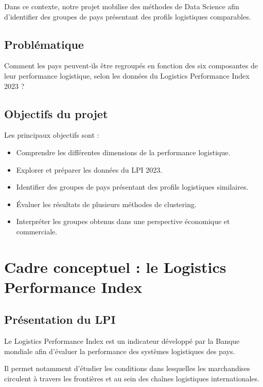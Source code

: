 \documentclass[11pt,a4paper]{article}
\begin{document}
Dans ce contexte, notre projet mobilise des méthodes de Data
Science afin d'identifier des groupes de pays présentant des
profils logistiques comparables.

\subsection*{Problématique}

Comment les pays peuvent-ils être regroupés en fonction des six
composantes de leur performance logistique, selon les données
du Logistics Performance Index 2023 ?

\subsection*{Objectifs du projet}

Les principaux objectifs sont :

\begin{itemize}
    \item Comprendre les différentes dimensions de la performance
    logistique.
    \item Explorer et préparer les données du LPI 2023.
    \item Identifier des groupes de pays présentant des profils
    logistiques similaires.
    \item Évaluer les résultats de plusieurs méthodes de clustering.
    \item Interpréter les groupes obtenus dans une perspective
    économique et commerciale.
\end{itemize}


\section{Cadre conceptuel : le Logistics Performance Index}

\subsection{Présentation du LPI}

Le Logistics Performance Index est un indicateur développé
par la Banque mondiale afin d'évaluer la performance des systèmes
logistiques des pays.

Il permet notamment d'étudier les conditions dans lesquelles
les marchandises circulent à travers les frontières et au sein
des chaînes logistiques internationales.
\end{document}
